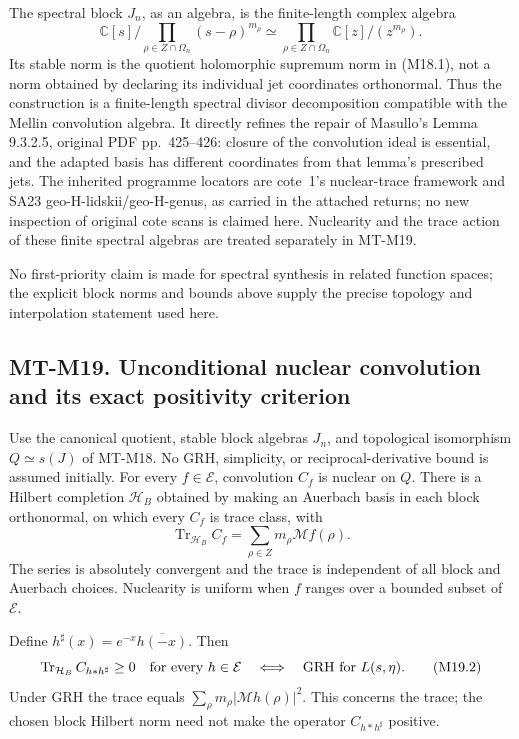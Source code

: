 \documentclass[11pt,a4paper]{article}
\begin{document}
The spectral block \(J_n\), as an algebra, is the
finite-length complex algebra
\[
 \mathbb C[s]\Big/
       \prod_{\rho\in Z\cap\Omega_n}(s-\rho)^{m_\rho}
 \simeq
 \prod_{\rho\in Z\cap\Omega_n}
                  \mathbb C[z]/(z^{m_\rho}).
\]
Its stable norm is the quotient holomorphic supremum
norm in (M18.1), not a norm obtained by declaring its
individual jet coordinates orthonormal.
Thus the construction is a finite-length spectral
divisor decomposition compatible with the Mellin
convolution algebra.  It directly refines the repair
of Masullo's Lemma 9.3.2.5, original PDF pp.~425--426:
closure of the convolution ideal is essential, and
the adapted basis has different coordinates from
that lemma's prescribed jets.  The inherited programme
locators are cote~1's nuclear-trace framework and
SA23 geo-H-lidskii/geo-H-genus, as carried in the
attached returns; no new inspection of original
cote scans is claimed here.  Nuclearity and the
trace action of these finite spectral algebras
are treated separately in MT-M19.

No first-priority claim is made for spectral synthesis in related
function spaces; the explicit block norms and bounds above supply
the precise topology and interpolation statement used here.



\subsection*{MT-M19. Unconditional nuclear convolution and its exact positivity criterion}
Use the canonical quotient, stable block algebras \(J_n\), and
topological isomorphism \(Q\simeq s(J)\) of MT-M18. No GRH,
simplicity, or reciprocal-derivative bound is assumed initially.
For every \(f\in\mathcal E\), convolution \(C_f\) is nuclear on
\(Q\). There is a Hilbert completion \(\mathcal H_B\) obtained
by making an Auerbach basis in each block orthonormal, on which
every \(C_f\) is trace class, with
\[
 \operatorname{Tr}_{\mathcal H_B} C_f
       =\sum_{\rho\in Z}m_\rho\mathcal Mf(\rho).       \tag{M19.1}
\]
The series is absolutely convergent and the trace is independent
of all block and Auerbach choices. Nuclearity is uniform when
\(f\) ranges over a bounded subset of \(\mathcal E\).

Define \(h^\sharp(x)=e^{-x}\overline{h(-x)}\). Then
\[
 \operatorname{Tr}_{\mathcal H_B} C_{h*h^\sharp}\ge0
          \quad\hbox{for every }h\in\mathcal E
 \quad\Longleftrightarrow\quad
 \text{GRH for }L(s,\eta).                              \tag{M19.2}
\]
Under GRH the trace equals
\(\sum_\rho m_\rho|\mathcal Mh(\rho)|^2\).
This concerns the trace; the chosen block Hilbert norm need
not make the operator \(C_{h*h^\sharp}\) positive.
\end{document}
